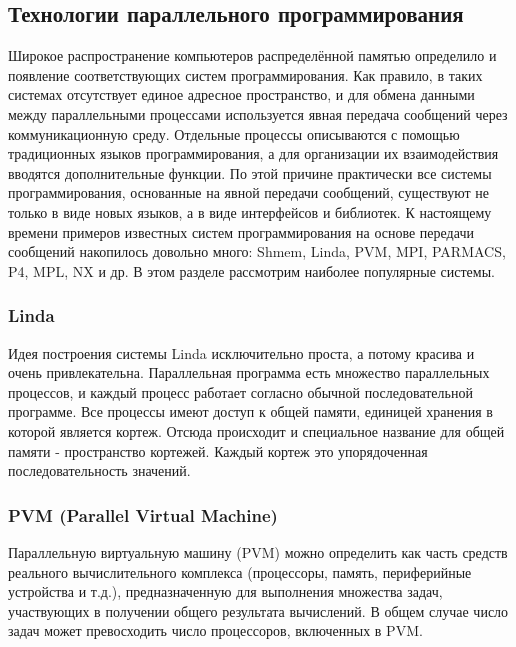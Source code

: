 \subsection{Технологии параллельного программирования}
Широкое распространение компьютеров  распределённой памятью определило и появление соответствующих систем программирования. Как правило, в таких системах отсутствует единое адресное пространство, и для обмена данными между параллельными процессами используется явная передача сообщений через коммуникационную среду. Отдельные процессы описываются с помощью традиционных языков программирования, а для организации их взаимодействия вводятся дополнительные функции. По этой причине практически все системы программирования, основанные на явной передачи сообщений, существуют не только в виде новых языков, а в виде интерфейсов и библиотек.
К настоящему времени примеров известных систем программирования на основе передачи сообщений накопилось довольно много: Shmem, Linda, PVM, MPI, PARMACS, P4, MPL, NX и др. В этом разделе рассмотрим наиболее популярные системы.
\subsubsection{Linda}
Идея построения системы Linda исключительно проста, а потому красива и очень привлекательна. Параллельная программа есть множество параллельных процессов, и каждый процесс работает согласно обычной последовательной программе. Все процессы имеют доступ к общей памяти, единицей хранения в которой является кортеж. Отсюда происходит и специальное название для общей памяти - пространство кортежей. Каждый кортеж это упорядоченная последовательность значений. 
\subsubsection{PVM (Parallel Virtual Machine)}
Параллельную виртуальную машину (PVM) можно определить как часть средств реального вычислительного комплекса (процессоры, память, периферийные устройства и т.д.), предназначенную для выполнения множества задач, участвующих в получении общего результата вычислений. В общем случае число задач может превосходить число процессоров, включенных в PVM.
